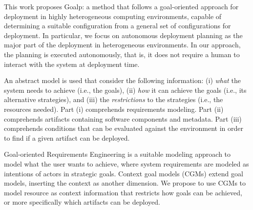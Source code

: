 This work proposes Goalp: a method that follows a goal-oriented approach for deployment in highly heterogeneous computing environments, capable of determining a suitable configuration from a general set of configurations for deployment. In particular, we focus on autonomous deployment planning as the major part of the deployment in heterogeneous environments.
In our approach, the planning is executed autonomously, that is, it does not require a human to interact with the system at deployment time.

An abstract model is used that consider the following information:
(i) \emph{what} the system needs to achieve (i.e., the goals), (ii) \emph{how} it can achieve the goals (i.e., its alternative strategies), and (iii) the \emph{restrictions} to the strategies (i.e., the resources needed).
Part (i) comprehends requirements modeling. Part (ii) comprehends artifacts containing software components and metadata. Part (iii) comprehends conditions that can be evaluated against the environment in order to find if a given artifact can be deployed.

Goal-oriented Requirements Engineering is a suitable modeling approach to model what the user wants to achieve, where system requirements are modeled as intentions of actors in strategic goals\cite{bresciani_tropos:_2004}\cite{dardenne_goal-directed_1993}\cite{yu_modelling_1996}. Context goal models (CGMs) extend goal models\cite{ali_goal-based_2010}, inserting the context as another dimension. We propose to use CGMs to model resource as context information that restricts how goals can be achieved, or more specifically which artifacts can be deployed.




